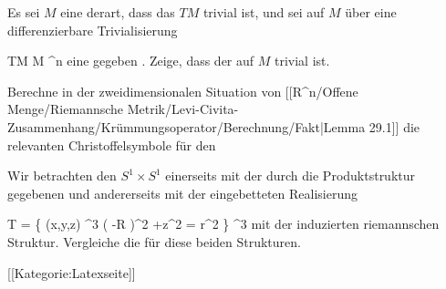 \setcounter{section}{29}


{}
{

Es sei $M$ eine
derart, dass das
$TM$ trivial ist, und sei auf $M$ über eine differenzierbare Trivialisierung

\mavergleichskette
{\vergleichskette
{ TM
}
{ \cong }{ M \times \R^n
}
{  }{
}
{    }{
}
{   }{
}
}
{}{}{}
 {} {}
eine
gegeben
 {} {.}
Zeige, dass der
auf $M$ trivial ist.

}
{} {}

{}
{

Berechne in der zweidimensionalen Situation von
[[R^n/Offene Menge/Riemannsche Metrik/Levi-Civita-Zusammenhang/Krümmungsoperator/Berechnung/Fakt|Lemma 29.1]]
die relevanten Christoffelsymbole für den

}
{} {}

{}
{

Wir betrachten den
$S^1 \times S^1$ einerseits mit der durch die Produktstruktur
 {} {}
gegebenen
und andererseits mit der eingebetteten Realisierung

\mavergleichskettedisp
{\vergleichskette
{ T
}
{ =} { \left\{ (x,y,z) \in \R^3  \mid   \left(   -R  \right)^2 +z^2  = r^2         \right\}
}
{ \subseteq} { \R^3
}
{ } {
}
{ } {
}
}
{}{}{}
mit der induzierten riemannschen Struktur. Vergleiche die
für diese beiden Strukturen.

}
{} {}


 [[Kategorie:Latexseite]]
